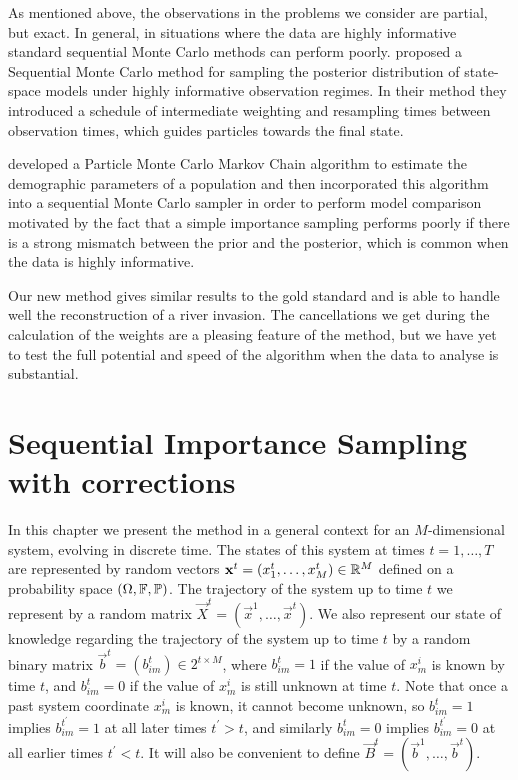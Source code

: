 As mentioned above, the observations in the problems we consider are partial, but exact. In general, in situations where the data are highly informative standard sequential Monte Carlo methods can perform poorly.
\cite{DelMoral} proposed a Sequential Monte Carlo method for sampling the posterior distribution of state-space models under highly informative observation regimes. In their method they introduced a schedule of intermediate weighting and resampling times between observation times, which guides particles towards the final state.

\cite{Finke} developed a Particle Monte Carlo Markov Chain algorithm to estimate the demographic parameters of a population and then incorporated this algorithm into a sequential Monte Carlo sampler in order to perform model comparison motivated by the fact that a simple importance sampling performs poorly if there is a strong mismatch between the prior and the posterior, which is common when the data is highly informative.

Our new method gives similar results to the gold standard and is able to handle well the reconstruction of a river invasion. The cancellations we get during the calculation of the weights are a pleasing feature of the method, but we have yet to test the full potential and speed of the algorithm when the data to analyse is substantial.

\section{Sequential Importance Sampling with corrections}
\label{sec:2}

In this chapter we present the method in a general context for an $M$-dimensional system, evolving in discrete time. The states of this system at times $t = 1, \dots, T$ are represented by random vectors $\mathbf{x}^t = (x^t_1, \dots, x^t_M) \in \mathbb R^M$ defined on a probability space $(\Omega, \mathbb{F}, \mathbb{P})$. The trajectory of the system up to time $t$ we represent by a random matrix $\vec{X}^t = (\vec{x}^1, \ldots, \vec{x}^t)$. We also represent our state of knowledge regarding the trajectory of the system up to time $t$ by a random binary matrix $\vec{b}^t = (b^t_{im}) \in 2^{t \times M}$, where $b^t_{im} = 1$ if the value of $x^i_m$ is known by time $t$, and $b^t_{im} = 0$ if the value of $x^i_m$ is still unknown at time $t$. Note that once a past system coordinate $x^i_m$ is known, it cannot become unknown, so $b^t_{im} = 1$ implies $b^{t^\prime}_{im} = 1$ at all later times $t^{\prime} > t$, and similarly $b^t_{im} = 0$ implies $b^{t^{\prime}}_{im} = 0$ at all earlier times $t^{\prime} < t$. It will also be convenient to define $\vec{B}^t = (\vec{b}^1,\ldots,\vec{b}^t)$.

